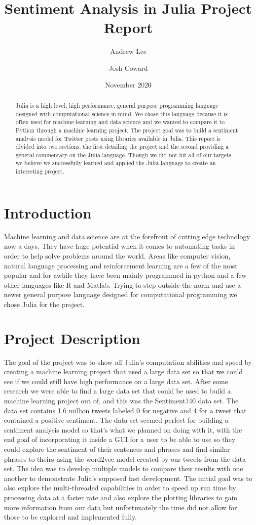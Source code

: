 \documentclass{article}
\title{Sentiment Analysis in Julia Project Report}
\author{Andrew Lee \\ \href{mailto:andrewlee733@u.boisestate.edu}{\color{blue}{andrewlee733@u.boisestate.edu}}
    \and Josh Coward \\ \href{mailto:joshcoward@u.boisestate.edu}{\color{blue}{joshcoward@u.boisestate.edu}} }
\date{November 2020}
\begin{document}
\maketitle
\begin{abstract}
Julia is a high level, high performance, general purpose programming language designed with computational science in mind.
We chose this language because it is often used for machine learning and data science and we wanted to compare it to Python through a machine learning project. The project goal was to build a sentiment analysis model for Twitter posts using libraries available in Julia. This report is divided into two sections: the first detailing the project and the second providing a general commentary on the Julia language. Though we did not hit all of our targets, we believe we successfully learned and applied the Julia language to create an interesting project.
\end{abstract}

\section{Introduction}
Machine learning and data science are at the forefront of cutting edge technology now a days. They have huge potential when it comes to automating tasks in order to help solve problems around the world. Areas like computer vision, natural language processing and reinforcement learning are a few of the most popular and for awhile they have been mainly programmed in python and a few other languages like R and Matlab. Trying to step outside the norm and use a newer general purpose language designed for computational programming we chose Julia for the project. 

\section{Project Description}
The goal of the project was to show off Julia's computation abilities and speed by creating a machine learning project that used a large data set so that we could see if we could still have high performance on a large data set. After some research we were able to find a large data set that could be used to build a machine learning project out of, and this was the Sentiment140 data set. The data set contains 1.6 million tweets labeled 0 for negative and 4 for a tweet that contained a positive sentiment. The data set seemed perfect for building a sentiment analysis model so that's what we planned on doing with it, with the end goal of incorporating it inside a GUI for a user to be able to use so they could explore the sentiment of their sentences and phrases and find similar phrases to theirs using the word2vec model created by our tweets from the data set. The idea was to develop multiple models to compare their results with one another to demonstrate Julia's supposed fast development. The initial goal was to also explore the multi-threaded capabilities in order to speed up run time by processing data at a faster rate and also explore the plotting libraries to gain more information from our data but unfortunately the time did not allow for those to be explored and implemented fully.
\end{document}
